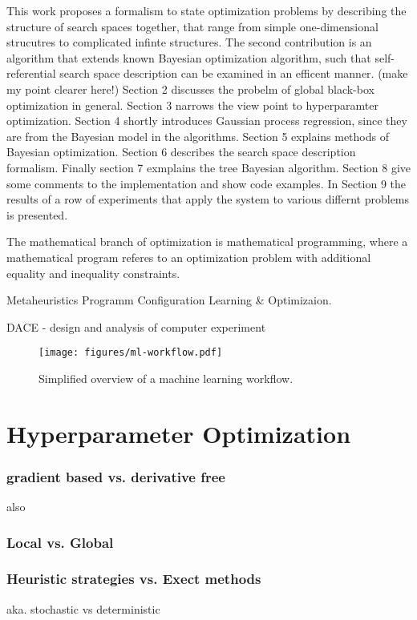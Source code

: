 \documentclass[english]{article}
\begin{document}
This work proposes a formalism to state optimization problems by describing the structure of search spaces together, that range from simple one-dimensional strucutres to complicated infinte structures. The second contribution is an algorithm that extends known Bayesian optimization algorithm, such that self-referential search space description can be examined in an efficent manner.
(make my point clearer here!)
Section 2 discusses the probelm of global black-box optimization in general. Section 3 narrows the view point to hyperparamter optimization.
Section 4 shortly introduces Gaussian process regression, since they are from the Bayesian model in the algorithms.
Section 5 explains methods of Bayesian optimization.
Section 6 describes the search space description formalism.
Finally section 7 exmplains the tree Bayesian algorithm.
Section 8 give some comments to the implementation and show code examples.
In Section 9 the results of a row of experiments that apply the system to various differnt problems is presented.


The mathematical branch of optimization is mathematical programming, where a mathematical program referes to an optimization problem with additional equality and inequality constraints.

Metaheuristics
Programm Configuration
Learning \& Optimizaion.

DACE - design and analysis of computer experiment

\begin{figure}
  \texttt{[image: figures/ml-workflow.pdf]}
  \caption{Simplified overview of a machine learning workflow.}
  \label{ml-workflow}
\end{figure}


\section{Hyperparameter Optimization}

\subsubsection*{gradient based vs. derivative free}
also

\subsubsection*{Local vs. Global}

\subsubsection*{Heuristic strategies vs. Exect methods}
aka. stochastic vs deterministic
\end{document}
